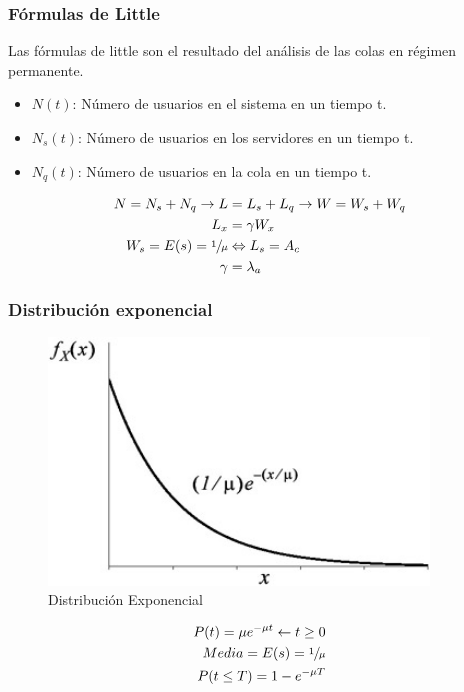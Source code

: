 \subsubsection{Fórmulas de Little}
Las fórmulas de little son el resultado del análisis de las colas en régimen permanente.
\begin{itemize}
	\item $N(t)$: Número de usuarios en el sistema en un tiempo t.
	\item $N_s(t)$: Número de usuarios en los servidores en un tiempo t.
	\item $N_q(t)$: Número de usuarios en la cola en un tiempo t.
\end{itemize}
\begin{align}%
N=N_s+N_q\to L &=L_s+L_q\to W=W_s+W_q\\
L_x &=\gamma W_x\\
W_s=E(s)=\sfrac{1}{\mu} & \Leftrightarrow L_s=A_c\\
\gamma &=\lambda_a
\end{align}
\subsubsection{Distribución exponencial}
\begin{figure}[H]
\centering
\includegraphics[width=0.9\textwidth]{Imagen/distribucionexponencial.jpg}
\caption{Distribución Exponencial}
\end{figure}
\begin{align}
P(t)=\mu e^{-\mu t} \leftarrow t\geq 0\\
Media=E(s)=\sfrac{1}{\mu}\\
P(t\leq T)=1-e^{-\mu T}
\end{align}
